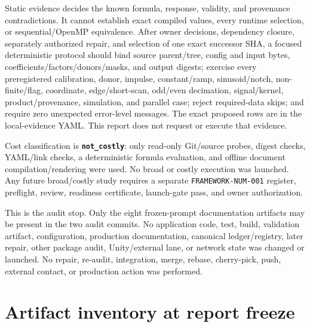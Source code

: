 \documentclass[11pt]{article}
\newcommand{\code}[1]{\nolinkurl{#1}}
\newcommand{\status}[1]{\textbf{\nolinkurl{#1}}}
\begin{document}
Static evidence decides the known formula, response, validity, and provenance
contradictions.  It cannot establish exact compiled values, every runtime
selection, or sequential/OpenMP equivalence.  After owner decisions,
dependency closure, separately authorized repair, and selection of one exact
successor SHA, a focused deterministic protocol should bind source parent/tree,
config and input bytes, coefficients/factors/donors/masks, and output digests;
exercise every preregistered calibration, donor, impulse, constant/ramp,
sinusoid/notch, non-finite/flag, coordinate, edge/short-scan, odd/even
decimation, signal/kernel, product/provenance, simulation, and parallel case;
reject required-data skips; and require zero unexpected error-level messages.
The exact proposed rows are in the local-evidence YAML.  This report does not
request or execute that evidence.

Cost classification is \status{not_costly}: only read-only Git/source probes,
digest checks, YAML/link checks, a deterministic formula evaluation, and
offline document compilation/rendering were used.  No broad or costly
execution was launched.  Any future broad/costly study requires a separate
\code{FRAMEWORK-NUM-001} register, preflight, review, readiness certificate,
launch-gate pass, and owner authorization.

This is the audit stop.  Only the eight frozen-prompt documentation artifacts
may be present in the two audit commits.  No application code, test, build,
validation artifact, configuration, production documentation, canonical
ledger/registry, later repair, other package audit, Unity/external lane, or
network state was changed or launched.  No repair, re-audit, integration,
merge, rebase, cherry-pick, push, external contact, or production action was
performed.

\appendix
\section{Artifact inventory at report freeze}
\end{document}
